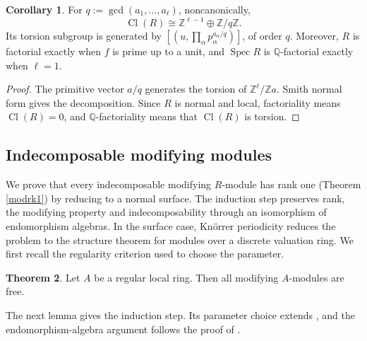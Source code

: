 \documentclass[a4paper,reqno]{amsart}
\DeclareMathOperator{\Cl}{Cl}
\DeclareMathOperator{\Spec}{Spec}
\theoremstyle{definition}
\newtheorem{Thm}{Theorem}[section]
\newtheorem{Cor}[Thm]{Corollary}
\begin{document}
\begin{Cor}\label{cor:class-group-factoriality}
For $q:=\gcd(a_1,\ldots,a_{\ell})$, noncanonically,
\[
\Cl(R)\cong\mathbb Z^{\ell-1}\oplus\mathbb Z/q\mathbb Z.
\]
Its torsion subgroup is generated by $[(u,\prod_\alpha p_\alpha^{a_\alpha/q})]$, of order $q$. Moreover, $R$ is factorial exactly when $f$ is prime up to a unit, and $\Spec R$ is $\mathbb Q$-factorial exactly when $\ell=1$.
\end{Cor}
\begin{proof}
The primitive vector $a/q$ generates the torsion of $\mathbb Z^{\ell}/\mathbb Za$. Smith normal form gives the decomposition. Since $R$ is normal and local, factoriality means $\Cl(R)=0$, and $\mathbb Q$-factoriality means that $\Cl(R)$ is torsion.
\end{proof}

\subsection{Indecomposable modifying modules}

We prove that every indecomposable modifying $R$-module has rank one (Theorem \ref{modrk1}) by reducing to a normal surface. The induction step preserves rank, the modifying property and indecomposability through an isomorphism of endomorphism algebras. In the surface case, Kn\"orrer periodicity reduces the problem to the structure theorem for modules over a discrete valuation ring. We first recall the regularity criterion used to choose the parameter.

\begin{Thm}\cite[4.4]{AG}\label{AusGol}
Let $A$ be a regular local ring. Then all modifying $A$-modules are free.
\end{Thm}

The next lemma gives the induction step. Its parameter choice extends \cite[Lemma 5.23]{IW18}, and the endomorphism-algebra argument follows the proof of \cite[Proposition 5.24]{IW18}.
\end{document}
